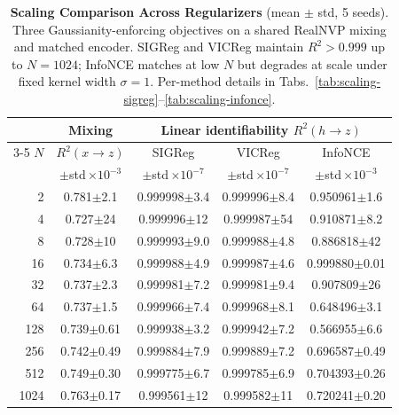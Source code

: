 \documentclass{article}
\begin{document}
\begin{table}[b]
\centering
\caption{\textbf{Scaling Comparison Across Regularizers} (mean $\pm$ std, 5 seeds). Three Gaussianity-enforcing objectives on a shared RealNVP mixing and matched encoder. SIGReg and VICReg maintain $R^2 > 0.999$ up to $N{=}1024$; InfoNCE matches at low $N$ but degrades at scale under fixed kernel width $\sigma{=}1$. Per-method details in Tabs.~\ref{tab:scaling-sigreg}--\ref{tab:scaling-infonce}.}
\label{tab:scaling-comparison}
\begin{tabular}{r c ccc}
  & \textbf{Mixing} & \multicolumn{3}{c}{\textbf{Linear identifiability} $R^2(h \to z)$} \\
\cmidrule(lr){3-5}
$N$ & $R^2(x \to z)$ & SIGReg & VICReg & InfoNCE \\
 & {\scriptsize $\pm$std\,$\times 10^{-3}$} & {\scriptsize $\pm$std\,$\times 10^{-7}$} & {\scriptsize $\pm$std\,$\times 10^{-7}$} & {\scriptsize $\pm$std\,$\times 10^{-3}$} \\
\midrule
  2 & 0.781\tiny{$\pm$2.1} & 0.999998\tiny{$\pm$3.4} & 0.999996\tiny{$\pm$8.4} & 0.950961\tiny{$\pm$1.6} \\
  4 & 0.727\tiny{$\pm$24} & 0.999996\tiny{$\pm$12} & 0.999987\tiny{$\pm$54} & 0.910871\tiny{$\pm$8.2} \\
  8 & 0.728\tiny{$\pm$10} & 0.999993\tiny{$\pm$9.0} & 0.999988\tiny{$\pm$4.8} & 0.886818\tiny{$\pm$42} \\
  16 & 0.734\tiny{$\pm$6.3} & 0.999988\tiny{$\pm$4.9} & 0.999987\tiny{$\pm$4.6} & 0.999880\tiny{$\pm$0.01} \\
  32 & 0.737\tiny{$\pm$2.3} & 0.999981\tiny{$\pm$7.2} & 0.999981\tiny{$\pm$9.4} & 0.907809\tiny{$\pm$26} \\
  64 & 0.737\tiny{$\pm$1.5} & 0.999966\tiny{$\pm$7.4} & 0.999968\tiny{$\pm$8.1} & 0.648496\tiny{$\pm$3.1} \\
  128 & 0.739\tiny{$\pm$0.61} & 0.999938\tiny{$\pm$3.2} & 0.999942\tiny{$\pm$7.2} & 0.566955\tiny{$\pm$6.6} \\
  256 & 0.742\tiny{$\pm$0.49} & 0.999884\tiny{$\pm$7.9} & 0.999889\tiny{$\pm$7.2} & 0.696587\tiny{$\pm$0.49} \\
  512 & 0.749\tiny{$\pm$0.30} & 0.999775\tiny{$\pm$6.7} & 0.999785\tiny{$\pm$6.9} & 0.704393\tiny{$\pm$0.26} \\
  1024 & 0.763\tiny{$\pm$0.17} & 0.999561\tiny{$\pm$12} & 0.999582\tiny{$\pm$11} & 0.720241\tiny{$\pm$0.20} \\
\bottomrule
\end{tabular}
\end{table}
\end{document}
